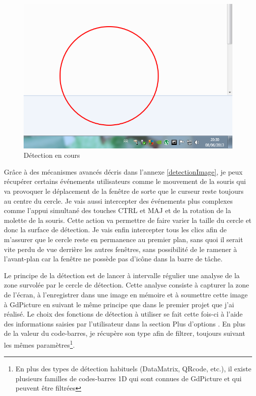 \begin{figure}
\begin{center}
\includegraphics[scale=0.5]{images/detector.png}
\end{center}
\caption{Détection en cours}
\label{detectionRing}
\end{figure}

Grâce à des mécanismes avancés décris dans l'annexe \ref{detectionImage}, je peux récupérer certains événements utilisateurs comme le mouvement de la souris qui va provoquer le déplacement de la fenêtre de sorte que le curseur reste toujours au centre du cercle. Je vais aussi intercepter des événements plus complexes comme l'appui simultané des touches CTRL et MAJ et de la rotation de la molette de la souris. Cette action va permettre de faire varier la taille du cercle et donc la surface de détection. Je vais enfin intercepter tous les clics afin de m'assurer que le cercle reste en permanence au premier plan, sans quoi il serait vite perdu de vue derrière les autres fenêtres, sans possibilité de le ramener à l'avant-plan car la fenêtre ne possède pas d'icône dans la barre de tâche.

Le principe de la détection est de lancer à intervalle régulier une analyse de la zone survolée par le cercle de détection. Cette analyse consiste à capturer la zone de l'écran, à l'enregistrer dans une image en mémoire et à soumettre cette image à GdPicture en suivant le même principe que dans le premier projet que j'ai réalisé. Le choix des fonctions de détection à utiliser se fait cette fois-ci à l'aide des informations saisies par l'utilisateur dans la section \og Plus d'options \fg{}. En plus de la valeur du code-barres, je récupère son type afin de filtrer, toujours suivant les mêmes paramètres\footnote{En plus des types de détection habituels (DataMatrix, QRcode, etc.), il existe plusieurs familles de codes-barres 1D qui sont connues de GdPicture et qui peuvent être filtrées}.

